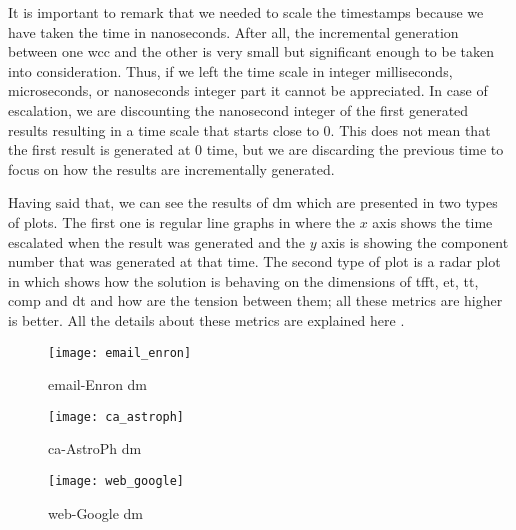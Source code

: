 It is important to remark that we needed to scale the timestamps because we have taken the time in nanoseconds. After all, the incremental generation between one \acrshort{wcc} and the other is very 
small but significant enough to be taken into consideration. Thus, if we left the time scale in integer milliseconds, microseconds, or nanoseconds integer part it cannot be appreciated. In case of escalation, we are discounting 
the nanosecond integer of the first generated results resulting in a time scale that starts close to $0$. This does not mean that the first result is generated at $0$ time, but we are discarding the previous time to focus on how the results are incrementally generated.

Having said that, we can see the results of \acrshort{dm} which are presented in two types of plots. The first one is regular line graphs in where the $x$ axis shows the time escalated when 
the result was generated and the $y$ axis is showing the component number that was generated at that time. The second type of plot is a radar plot in which shows how the solution is behaving 
on the dimensions of  \acrfull{tfft}, \acrfull{et}, \acrfull{tt}, \acrfull{comp} and \acrfull{dt} and how are the tension between them; all these metrics are higher is better. 
All the details about these metrics are explained here \cite{diefpaper}.

\begin{figure}[!htb]
    \centering
    \begin{minipage}{0.33\textwidth}
     \texttt{[image: email\_enron]}
      \caption{email-Enron \acrshort{dm}}
      \label{fig:dief:1}
    \end{minipage}%
    \begin{minipage}{0.33\textwidth}
     \texttt{[image: ca\_astroph]}
      \caption{ca-AstroPh \acrshort{dm}}
      \label{fig:dief:2}
    \end{minipage}%
    \begin{minipage}{0.33\textwidth}
     \texttt{[image: web\_google]}
      \caption{web-Google \acrshort{dm}}
      \label{fig:dief:3}
    \end{minipage}
\end{figure}

